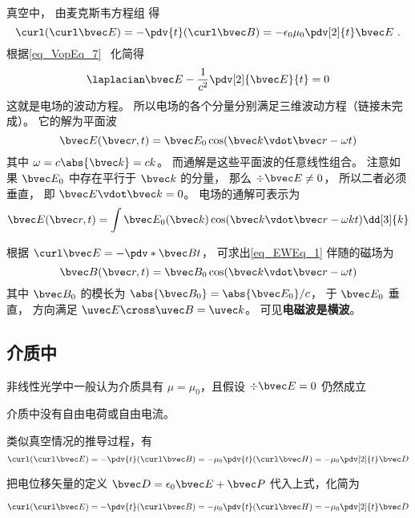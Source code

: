 
\begin{issues}
\issueDraft
{}
\end{issues}


真空中， 由麦克斯韦方程组 得
\begin{equation}
\curl(\curl\bvec E) = -\pdv{t} (\curl\bvec B) = -\epsilon_0\mu_0 \pdv[2]{t} \bvec E~.
\end{equation}
根据\autoref{eq_VopEq_7}~ 化简得
\begin{equation}
\laplacian \bvec E - \frac{1}{c^2} \pdv[2]{\bvec E}{t} = 0
\end{equation}
这就是电场的波动方程。 所以电场的各个分量分别满足三维波动方程（链接未完成）。 它的解为平面波
\begin{equation}\label{eq_EWEq_1}
\bvec E(\bvec r, t) = \bvec E_0 \cos(\bvec k\vdot \bvec r - \omega t)
\end{equation}
其中 $\omega = c\abs{\bvec k} = ck$。 而通解是这些平面波的任意线性组合。 注意如果 $\bvec E_0$ 中存在平行于 $\bvec k$ 的分量， 那么 $\div \bvec E \ne 0$， 所以二者必须垂直， 即 $\bvec E \vdot \bvec k = 0$。 电场的通解可表示为
\begin{equation}
\bvec E(\bvec r, t) = \int \bvec E_0(\bvec k) \cos(\bvec k\vdot \bvec r - \omega k t) \dd[3]{k}
\end{equation}

根据 $\curl \bvec E = -\pdv*{\bvec B}{t}$， 可求出\autoref{eq_EWEq_1} 伴随的磁场为
\begin{equation}
\bvec B(\bvec r, t) = \bvec B_0 \cos(\bvec k \vdot \bvec r - \omega t)
\end{equation}
其中 $\bvec B_0$ 的模长为 $\abs{\bvec B_0} = \abs{\bvec E_0}/c$， 于 $\bvec E_0$ 垂直， 方向满足 $\uvec E \cross \uvec B = \uvec k$。 可见\textbf{电磁波是横波}。

\subsection{介质中}

非线性光学中一般认为介质具有 $\mu = \mu_0$，且假设 $\div\bvec E = 0$ 仍然成立

介质中没有自由电荷或自由电流。

类似真空情况的推导过程，有
\begin{equation}
\curl(\curl\bvec E) = -\pdv{t} (\curl\bvec B) = -\mu_0 \pdv{t} (\curl\bvec H)
= -\mu_0 \pdv[2]{t} \bvec D
\end{equation}

把电位移矢量的定义 $\bvec D = \epsilon_0\bvec E + \bvec P$ 代入上式，化简为

\begin{equation}
\curl(\curl\bvec E) = -\pdv{t} (\curl\bvec B) = -\mu_0 \pdv{t} (\curl\bvec H)
= -\mu_0 \pdv[2]{t} \bvec D
\end{equation}